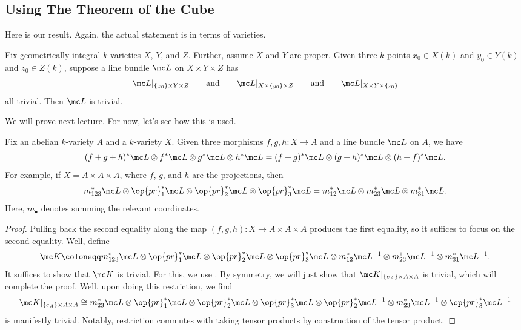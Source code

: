 \documentclass[../notes.tex]{subfiles}
\begin{document}
\subsection{Using The Theorem of the Cube}
Here is our result. Again, the actual statement is in terms of varieties.
\begin{theorem} \label{thm:cube}
	Fix geometrically integral $k$-varieties $X$, $Y$, and $Z$. Further, assume $X$ and $Y$ are proper. Given three $k$-points $x_0\in X(k)$ and $y_0\in Y(k)$ and $z_0\in Z(k)$, suppose a line bundle $\mc L$ on $X\times Y\times Z$ has
	\[\mc L|_{\{x_0\}\times Y\times Z}\qquad\text{and}\qquad\mc L|_{X\times\{y_0\}\times Z}\qquad\text{and}\qquad\mc L|_{X\times Y\times\{z_0\}}\]
	all trivial. Then $\mc L$ is trivial.
\end{theorem}
We will prove  next lecture. For now, let's see how this is used.
\begin{corollary} \label{cor:cube-av}
	Fix an abelian $k$-variety $A$ and a $k$-variety $X$. Given three morphisms $f,g,h\colon X\to A$ and a line bundle $\mc L$ on $A$, we have
	\[(f+g+h)^*\mc L\otimes f^*\mc L\otimes g^*\mc L\otimes h^*\mc L=(f+g)^*\mc L\otimes(g+h)^*\mc L\otimes(h+f)^*\mc L.\]
	For example, if $X=A\times A\times A$, where $f$, $g$, and $h$ are the projections, then
	\[m_{123}^*\mc L\otimes\op{pr}_1^*\mc L\otimes\op{pr}_2^*\mc L\otimes\op{pr}_3^*\mc L=m_{12}^*\mc L\otimes m_{23}^*\mc L\otimes m_{31}^*\mc L.\]
	Here, $m_\bullet$ denotes summing the relevant coordinates.
\end{corollary}
\begin{proof}
	Pulling back the second equality along the map $(f,g,h)\colon X\to A\times A\times A$ produces the first equality, so it suffices to focus on the second equality. Well, define
	\[\mc K\coloneqq m_{123}^*\mc L\otimes\op{pr}_1^*\mc L\otimes\op{pr}_2^*\mc L\otimes\op{pr}_3^*\mc L\otimes m_{12}^*\mc L^{-1}\otimes m_{23}^*\mc L^{-1}\otimes m_{31}^*\mc L^{-1}.\]
	It suffices to show that $\mc K$ is trivial. For this, we use . By symmetry, we will just show that $\mc K|_{\{e_A\}\times A\times A}$ is trivial, which will complete the proof. Well, upon doing this restriction, we find
	\[\mc K|_{\{e_A\}\times A\times A}\cong m_{23}^*\mc L\otimes\op{pr}_1^*\mc L\otimes\op{pr}_2^*\mc L\otimes\op{pr}_3^*\mc L\otimes \op{pr}_2^*\mc L^{-1}\otimes m_{23}^*\mc L^{-1}\otimes\op{pr}_{3}^*\mc L^{-1}\]
	is manifestly trivial. Notably, restriction commutes with taking tensor products by construction of the tensor product.
\end{proof}
\end{document}

